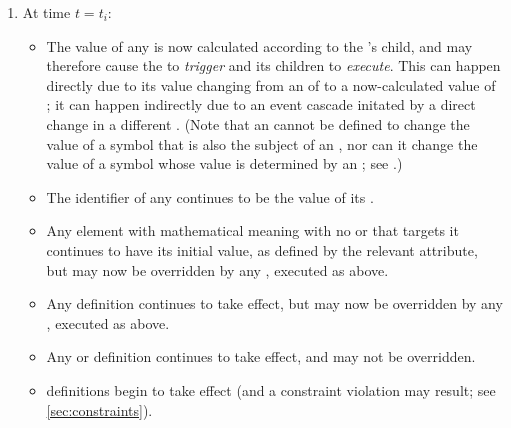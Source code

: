 \begin{enumerate}
\item At time $t = t_i$:
  \begin{itemize}  

  \item The value of any \Event \Trigger is now calculated according to the \Trigger's \Math child, and may therefore cause the \Event to \emph{trigger} and its \EventAssignment children to \emph{execute}.  This can happen directly due to its value changing from an  of  to a now-calculated value of ; it can happen indirectly due to an event cascade initated by a direct change in a different \Event{}.
    (Note that an \Event cannot be
    defined to change the value of a symbol that is also the
    subject of an \AssignmentRule, nor can it change the value of a symbol whose value is determined by an \AlgebraicRule; see .)

  \item The identifier of any \Reaction continues to be the value of its \KineticLaw{}.

  \item Any element with mathematical meaning with no \InitialAssignment or \Rule that targets it continues to have its initial value, as defined by the relevant attribute, but may now be overridden by any \EventAssignment{}, executed as above.

  \item Any \InitialAssignment definition continues to take effect, but may now be overridden by any \EventAssignment{}, executed as above.

  \item Any \AssignmentRule or \AlgebraicRule definition continues to take effect, and may not be overridden.

  \item \Constraint definitions begin to take effect (and a
    constraint violation may result; see
    \ref{sec:constraints}).


\end{itemize}
\end{enumerate}
